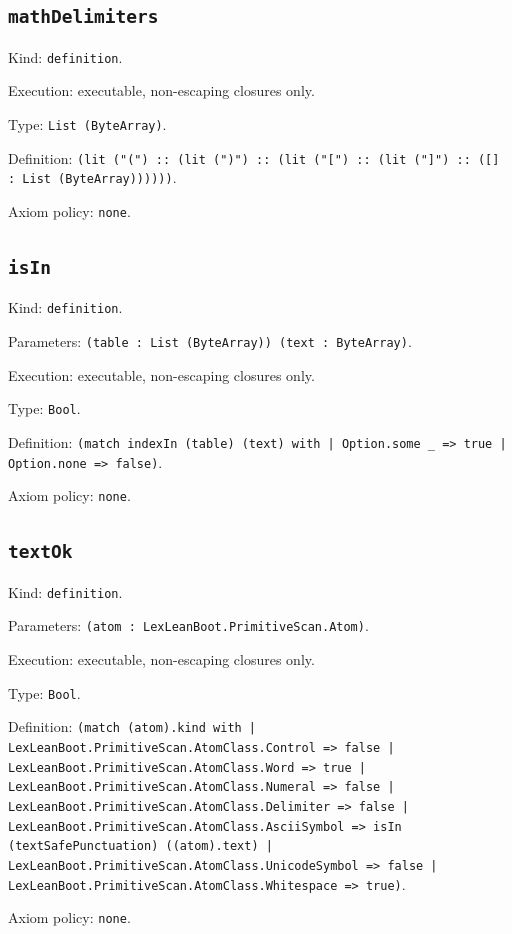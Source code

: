 \documentclass[11pt]{article}
\begin{document}
\subsection*{\texttt{mathDelimiters}}
\noindent Kind: \texttt{definition}.\par
\noindent Execution: executable, non-escaping closures only.\par
\noindent Type: \texttt{List (ByteArray)}.\par
\noindent Definition: \texttt{(lit ("(") :: (lit (")") :: (lit ("[") :: (lit ("]") :: ([] : List (ByteArray))))))}.\par
\noindent Axiom policy: \texttt{none}.\par
\subsection*{\texttt{isIn}}
\noindent Kind: \texttt{definition}.\par
\noindent Parameters: \texttt{(table : List (ByteArray)) (text : ByteArray)}.\par
\noindent Execution: executable, non-escaping closures only.\par
\noindent Type: \texttt{Bool}.\par
\noindent Definition: \texttt{(match indexIn (table) (text) with | Option.some \_ => true | Option.none => false)}.\par
\noindent Axiom policy: \texttt{none}.\par
\subsection*{\texttt{textOk}}
\noindent Kind: \texttt{definition}.\par
\noindent Parameters: \texttt{(atom : LexLeanBoot.PrimitiveScan.Atom)}.\par
\noindent Execution: executable, non-escaping closures only.\par
\noindent Type: \texttt{Bool}.\par
\noindent Definition: \texttt{(match (atom).kind with | LexLeanBoot.PrimitiveScan.AtomClass.Control => false | LexLeanBoot.PrimitiveScan.AtomClass.Word => true | LexLeanBoot.PrimitiveScan.AtomClass.Numeral => false | LexLeanBoot.PrimitiveScan.AtomClass.Delimiter => false | LexLeanBoot.PrimitiveScan.AtomClass.AsciiSymbol => isIn (textSafePunctuation) ((atom).text) | LexLeanBoot.PrimitiveScan.AtomClass.UnicodeSymbol => false | LexLeanBoot.PrimitiveScan.AtomClass.Whitespace => true)}.\par
\noindent Axiom policy: \texttt{none}.\par
\end{document}
